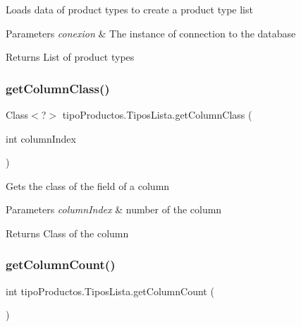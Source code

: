 Loads data of product types to create a product type list 
\begin{DoxyParams}{Parameters}
{\em conexion} & The instance of connection to the database \\
\hline
\end{DoxyParams}
\begin{DoxyReturn}{Returns}
List of product types 
\end{DoxyReturn}
\mbox{\label{classtipo_productos_1_1_tipos_lista_a87b924c7d8f72e7615286c41d19c2589}} 
\subsubsection{\texorpdfstring{get\+Column\+Class()}{getColumnClass()}}
{\footnotesize\ttfamily Class$<$?$>$ tipo\+Productos.\+Tipos\+Lista.\+get\+Column\+Class (\begin{DoxyParamCaption}\item[{int}]{column\+Index }\end{DoxyParamCaption})\hspace{0.3cm}{\ttfamily [inline]}}

Gets the class of the field of a column 
\begin{DoxyParams}{Parameters}
{\em column\+Index} & number of the column \\
\hline
\end{DoxyParams}
\begin{DoxyReturn}{Returns}
Class of the column 
\end{DoxyReturn}
\mbox{\label{classtipo_productos_1_1_tipos_lista_ae09ef2d57d7c7989d4e0e99463294761}} 
\subsubsection{\texorpdfstring{get\+Column\+Count()}{getColumnCount()}}
{\footnotesize\ttfamily int tipo\+Productos.\+Tipos\+Lista.\+get\+Column\+Count (\begin{DoxyParamCaption}{ }\end{DoxyParamCaption})\hspace{0.3cm}{\ttfamily [inline]}}

